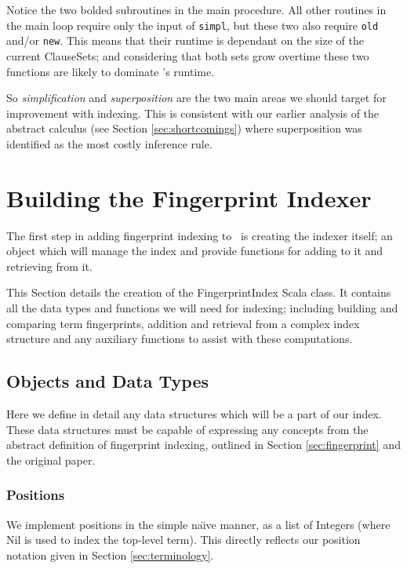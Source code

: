 Notice the two bolded subroutines in the main procedure. All other
routines in the main loop require only the input of \verb!simpl!, but these two
also require \verb!old! and/or \verb!new!. This means that their runtime is dependant
on the size of the current ClauseSets; and considering that both sets grow overtime
these two functions are likely to dominate \beagle's runtime.

So \emph{simplification} and \emph{superposition} are the two main areas
we should target for improvement with indexing. This is consistent
with our earlier analysis of the abstract calculus (see Section \ref{sec:shortcomings})
where superposition was identified as the most costly inference rule.

\section{Building the Fingerprint Indexer}
\label{sec:initial}

The first step in adding fingerprint indexing to \beagle\ is creating the indexer
itself; an object which will manage the index and provide functions for adding
to it and retrieving from it.

This Section details the creation of the FingerprintIndex Scala class. It contains
all the data types and functions we will need for indexing; including building
and comparing term fingerprints, addition and retrieval from a complex index structure
and any auxiliary functions to assist with these computations.

\subsection{Objects and Data Types}
\label{sec:datatypes}

Here we define in detail any data structures which will be a part of our index.
These data structures must be capable of expressing any concepts from
the abstract definition of fingerprint indexing, outlined in Section \ref{sec:fingerprint}
and the original paper\cite{shulz12}.

\subsubsection{Positions}

We implement positions in the simple na\"{\i}ve manner, as a list of
Integers (where Nil is used to index the top-level term). This
directly reflects our position notation given in Section \ref{sec:terminology}.

